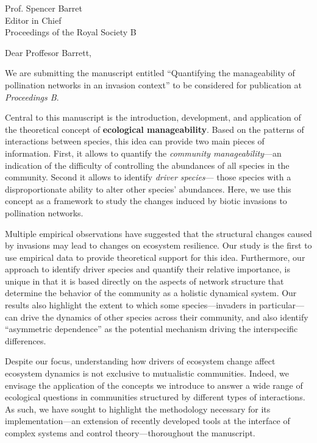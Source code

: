 \documentclass[10pt, a4paper]{letter}
\begin{document}
\begin{letter}{
       Prof. Spencer Barret\\
       Editor in Chief\\
       Proceedings of the Royal Society B}

\opening{Dear Proffesor Barrett,}

We are submitting the manuscript entitled ``Quantifying the manageability of pollination networks in an invasion context'' to be considered for publication at \emph{Proceedings B}. 

Central to this manuscript is the introduction, development, and application of the theoretical concept of \textbf{ecological manageability}.
Based on the patterns of interactions between species, this idea can provide two main pieces of information. 
First, it allows to quantify the \textit{community manageability}---an indication of the difficulty of controlling the abundances of all species in the community. 
Second it allows to identify \textit{driver species}--- those species with a disproportionate ability to alter other species' abundances.  
Here, we use this concept as a framework to study the changes induced by biotic invasions to pollination networks. 

Multiple empirical observations have suggested that the structural changes caused by invasions may lead to changes on ecosystem resilience. 
Our study is the first to use empirical data to provide theoretical support for this idea. 
Furthermore, our approach to identify driver species and quantify their relative importance, is unique in that it is based directly on the aspects of network structure that determine the behavior of the community as a holistic dynamical system. 
Our results also highlight the extent to which some species---invaders in particular---can drive the dynamics of other species across their community, and also identify ``asymmetric dependence'' as the potential mechanism driving the interspecific differences.

Despite our focus, understanding how drivers of ecosystem change affect ecosystem dynamics is not exclusive to mutualistic communities. 
Indeed, we envisage the application of the concepts we introduce to answer a wide range of ecological questions in communities structured by different types of interactions.
As such, we have sought to highlight the methodology necessary for its implementation---an extension of recently developed tools at the interface of complex systems and control theory---thoroughout the manuscript. 


\end{letter}
\end{document}
